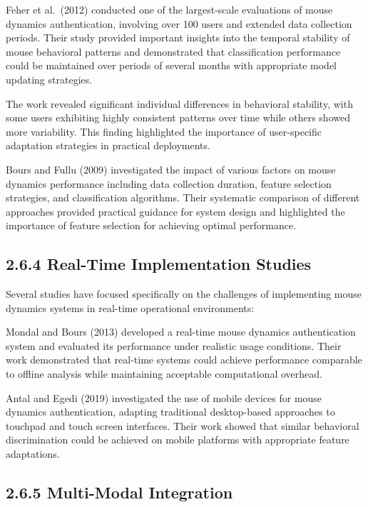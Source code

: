 \documentclass[
  12pt,
  a4paper,
]{report}
\begin{document}
Feher et al.~(2012) conducted one of the largest-scale evaluations of
mouse dynamics authentication, involving over 100 users and extended
data collection periods. Their study provided important insights into
the temporal stability of mouse behavioral patterns and demonstrated
that classification performance could be maintained over periods of
several months with appropriate model updating strategies.

The work revealed significant individual differences in behavioral
stability, with some users exhibiting highly consistent patterns over
time while others showed more variability. This finding highlighted the
importance of user-specific adaptation strategies in practical
deployments.

Bours and Fullu (2009) investigated the impact of various factors on
mouse dynamics performance including data collection duration, feature
selection strategies, and classification algorithms. Their systematic
comparison of different approaches provided practical guidance for
system design and highlighted the importance of feature selection for
achieving optimal performance.

\subsection{2.6.4 Real-Time Implementation
Studies}\label{real-time-implementation-studies}

Several studies have focused specifically on the challenges of
implementing mouse dynamics systems in real-time operational
environments:

Mondal and Bours (2013) developed a real-time mouse dynamics
authentication system and evaluated its performance under realistic
usage conditions. Their work demonstrated that real-time systems could
achieve performance comparable to offline analysis while maintaining
acceptable computational overhead.

Antal and Egedi (2019) investigated the use of mobile devices for mouse
dynamics authentication, adapting traditional desktop-based approaches
to touchpad and touch screen interfaces. Their work showed that similar
behavioral discrimination could be achieved on mobile platforms with
appropriate feature adaptations.

\subsection{2.6.5 Multi-Modal
Integration}\label{multi-modal-integration}
\end{document}

